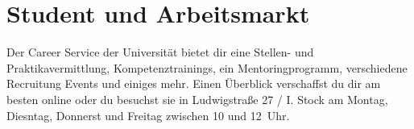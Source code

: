 \begin{urlList}
\end{urlList}

\section{Student und Arbeitsmarkt}

Der Career Service der Universität bietet dir eine Stellen- und Praktikavermittlung, Kompetenztrainings, ein Mentoringprogramm, verschiedene Recruitung Events und einiges mehr. Einen Überblick verschaffst du dir am besten online oder du besuchst sie in Ludwigstraße 27 / I. Stock am Montag, Diesntag, Donnerst und Freitag zwischen 10 und 12~Uhr.

\begin{urlList}
\end{urlList}

